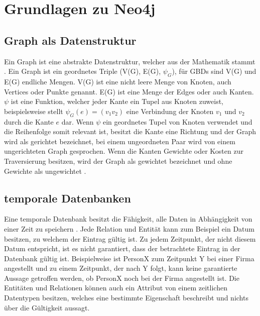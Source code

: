 
\chapter{Grundlagen zu Neo4j} %

\label{Kaptiel 2} %

\section{Graph als Datenstruktur}
Ein Graph ist eine abstrakte Datenstruktur, welcher aus der Mathematik stammt \parencite{vicknair2010comparison}. Ein Graph ist ein geordnetes Triple (V(G), E(G), $\psi_G$), für GBDs sind V(G) und E(G) endliche Mengen. V(G) ist eine nicht leere Menge von Knoten, auch Vertices oder Punkte genannt. E(G) ist eine Menge der Edges oder auch Kanten. $\psi$ ist eine Funktion, welcher jeder Kante ein Tupel aus Knoten zuweist, beispielsweise stellt $\psi_G (e) = (v_1 v_2)$ eine Verbindung der Knoten $v_1$ und $v_2$ durch die Kante $e$ dar. Wenn $\psi$ ein geordnetes Tupel von Knoten verwendet und die Reihenfolge somit relevant ist, besitzt die Kante  eine  Richtung und der Graph wird als gerichtet bezeichnet, bei einem ungeordneten Paar wird von einem ungerichteten Graph gesprochen. Wenn die Kanten Gewichte oder Kosten zur Traversierung besitzen, wird der Graph als gewichtet bezeichnet und ohne Gewichte als ungewichtet \parencite{bondy1976graph}.

 \section{temporale Datenbanken}
 Eine temporale Datenbank besitzt die Fähigkeit, alle Daten in Abhängigkeit von einer Zeit zu speichern \parencite{campos2016towards}. Jede Relation und Entität kann zum Beispiel ein Datum besitzen, zu welchem der Eintrag gültig ist. Zu jedem  Zeitpunkt, der nicht diesem Datum entspricht, ist es nicht garantiert, dass der betrachtete Eintrag in der Datenbank gültig ist. Beispielweise ist PersonX zum Zeitpunkt Y bei einer Firma angestellt und zu einem Zeitpunkt, der nach Y folgt, kann keine garantierte Aussage getroffen werden, ob PersonX noch bei der Firma angestellt ist. \newline
 Die Entitäten und Relationen können auch ein Attribut von einem zeitlichen Datentypen besitzen, welches eine bestimmte Eigenschaft beschreibt und nichts über die Gültigkeit aussagt\parencite{khurana2012introduction}.  
